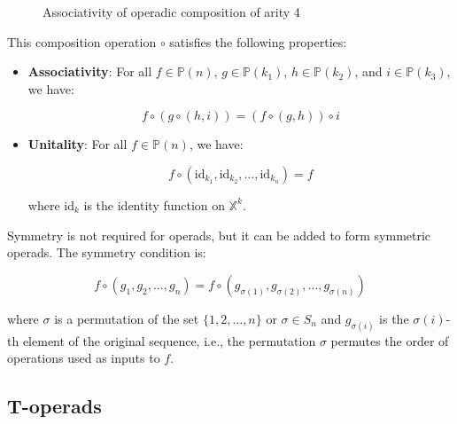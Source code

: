 \begin{figure}[h]
\caption{Associativity of operadic composition of arity 4}
\label{fig:arity-4-associativity}
\end{figure}

This composition operation $\circ$ satisfies the following properties:

\begin{itemize}
  \item \textbf{Associativity}: For all $f \in \mathbb{P}(n)$, $g \in \mathbb{P}(k_1)$, $h \in \mathbb{P}(k_2)$, and $i \in \mathbb{P}(k_3)$, we have:

  \begin{equation}
    f \circ (g \circ (h, i)) = (f \circ (g, h)) \circ i
  \end{equation}

  \item \textbf{Unitality}: For all $f \in \mathbb{P}(n)$, we have:

  \begin{equation}
    f \circ (\text{id}_{k_1}, \text{id}_{k_2}, \ldots, \text{id}_{k_n}) = f
  \end{equation}

  where $\text{id}_k$ is the identity function on $\mathbb{X}^k$.
\end{itemize}

Symmetry is not required for operads, but it can be added to form symmetric operads. The symmetry condition is:

\begin{equation}
  f \circ (g_1, g_2, \ldots, g_n) = f \circ (g_{\sigma(1)}, g_{\sigma(2)}, \ldots, g_{\sigma(n)})
\end{equation}

where $\sigma$ is a permutation of the set $\{1, 2, \ldots, n\}$ or $\sigma \in S_n$ and $g_{\sigma(i)}$ is the $\sigma(i)$-th element of the original sequence, i.e., the permutation $\sigma$ permutes the order of operations used as inputs to $f$.

\subsection{T-operads}

